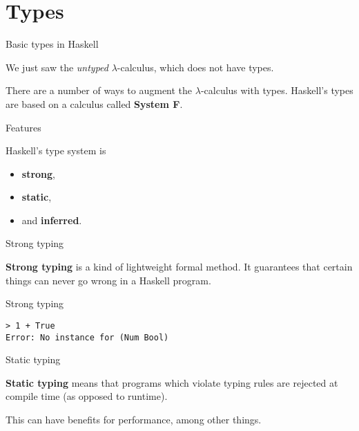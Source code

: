 
\section{Types}

%
\begin{frame}{Basic types in Haskell}

We just saw the \emph{untyped} $\lambda$-calculus, which does not have types.

There are a number of ways to augment the $\lambda$-calculus with types.
Haskell's types are based on a calculus called \textbf{System F}.

\end{frame}

%
\begin{frame}{Features}

Haskell's type system is 

\begin{itemize}
  \item \textbf{strong},
  \item \textbf{static},
  \item and \textbf{inferred}.
\end{itemize}

\end{frame}

%
\begin{frame}[fragile]{Strong typing}

\textbf{Strong typing} is a kind of lightweight formal method. It guarantees
that certain things can never go wrong in a Haskell program.

\begin{block}{Strong typing}
\begin{verbatim}
> 1 + True
Error: No instance for (Num Bool)
\end{verbatim}
\end{block}

\end{frame}

%
\begin{frame}[fragile]{Static typing}

\textbf{Static typing} means that programs which violate typing rules are
rejected at compile time (as opposed to runtime).

This can have benefits for performance, among other things.

\end{frame}

